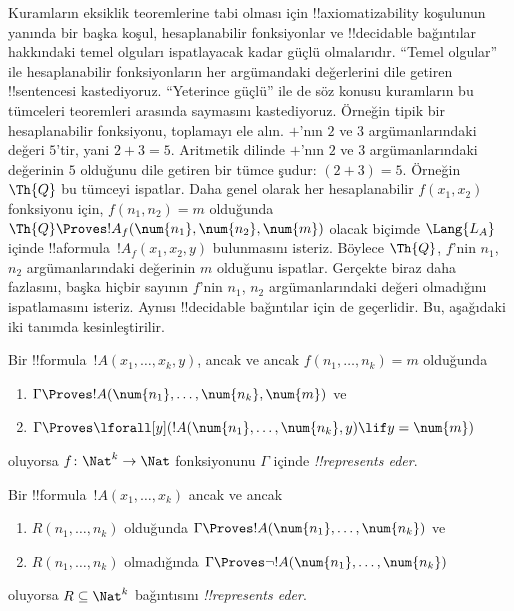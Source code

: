 Kuramların eksiklik teoremlerine tabi olması için !!{axiomatizability}
koşulunun yanında bir başka koşul, hesaplanabilir fonksiyonlar ve !!{decidable}
bağıntılar hakkındaki temel olguları ispatlayacak kadar güçlü olmalarıdır.
``Temel olgular'' ile hesaplanabilir fonksiyonların her argümandaki
değerlerini dile getiren !!{sentence}s{}i kastediyoruz. ``Yeterince güçlü''
ile de söz konusu kuramların bu tümceleri teoremleri arasında saymasını
kastediyoruz. Örneğin tipik bir hesaplanabilir fonksiyonu, toplamayı ele
alın. $+$'nın $2$ ve $3$ argümanlarındaki değeri $5$'tir, yani $2+3=5$.
Aritmetik dilinde $+$'nın $2$ ve $3$ argümanlarındaki değerinin $5$
olduğunu dile getiren bir tümce şudur: $(\num{2}+\num{3})=\num{5}$.
Örneğin $\Th{Q}$ bu tümceyi ispatlar. Daha genel olarak her hesaplanabilir
$f(x_1,x_2)$ fonksiyonu için, $f(n_1,n_2)=m$ olduğunda
$\Th{Q}\Proves !A_f(\num{n_1},\num{n_2},\num{m})$ olacak biçimde
$\Lang{L_A}$ içinde !!a{formula}~$!A_f(x_1,x_2,y)$ bulunmasını isteriz.
Böylece $\Th{Q}$, $f$'nin $n_1$, $n_2$ argümanlarındaki değerinin $m$
olduğunu ispatlar. Gerçekte biraz daha fazlasını, başka hiçbir sayının
$f$'nin $n_1$, $n_2$ argümanlarındaki değeri olmadığını ispatlamasını isteriz.
Aynısı !!{decidable} bağıntılar için de geçerlidir. Bu, aşağıdaki iki tanımda
kesinleştirilir.

\begin{defn}
Bir !!{formula}~$!A(x_1, \dots, x_k, y)$, ancak ve ancak
$f(n_1,\dots,n_k)=m$ olduğunda
\begin{enumerate}
\item $\Gamma \Proves !A(\num{n_1}, \dots, \num{n_k}, \num{m})$ ve
\item $\Gamma \Proves \lforall[y](!A(\num{n_1}, \dots, \num{n_k},
y) \lif y = \num{m})$
\end{enumerate}
oluyorsa $f\colon \Nat^k \to \Nat$ fonksiyonunu $\Gamma$ içinde
\emph{!!{represents} eder}.
\end{defn}

\begin{defn}
Bir !!{formula}~$!A(x_1, \dots, x_k)$ ancak ve ancak
\begin{enumerate}
\item $R(n_1, \dots, n_k)$ olduğunda $\Gamma \Proves !A(\num{n_1},
\dots, \num{n_k})$ ve
\item $R(n_1, \dots, n_k)$ olmadığında $\Gamma \Proves \lnot
!A(\num{n_1}, \dots, \num{n_k})$
\end{enumerate}
oluyorsa $R \subseteq \Nat^k$ bağıntısını \emph{!!{represents} eder}.
\end{defn}

